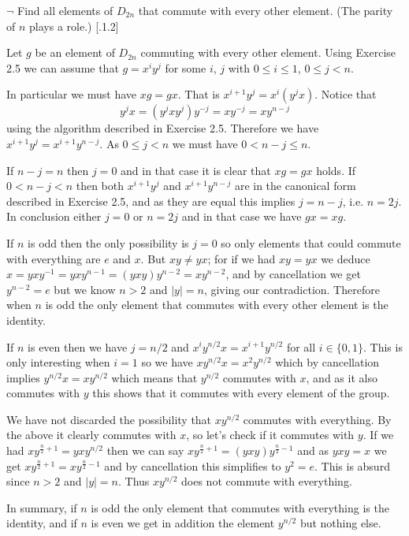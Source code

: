 \begin{exercise}
	$\neg$ Find all elements of $D_{2n}$ that commute with every other element. (The parity of $n$ plays a role.) [.1.2]
\end{exercise}
\begin{solution}
	Let $g$ be an element of $D_{2n}$ commuting with every other element. Using Exercise 2.5 we can assume that $g = x^iy^j$ for some $i$, $j$ with $0 \leq i \leq 1$, $0\leq j < n$. 
	
	In particular we must have $xg = gx$. That is $x^{i+1}y^j = x^i(y^jx)$. Notice that 
	\[
		y^jx = (y^jxy^j)y^{-j} = xy^{-j} = xy^{n-j}
	\]
	using the algorithm described in Exercise 2.5. Therefore we have $x^{i+1}y^j = x^{i+1}y^{n-j}$. As $0\leq j < n$ we must have $0<n-j\leq n$.
	
	If $n-j = n$ then $j = 0$ and in that case it is clear that $xg=gx$ holds. If $0<n-j <n$ then both $x^{i+1}y^j$ and $x^{i+1}y^{n-j}$ are in the canonical form described in Exercise 2.5, and as they are equal this implies $j = n-j$, i.e. $n = 2j$. In conclusion either $j = 0$ or $n = 2j$ and in that case we have $gx = xg$.
	
	If $n$ is odd then the only possibility is $j=0$ so only elements that could commute with everything are $e$ and $x$. But $xy\neq yx$; for if we had $xy = yx$ we deduce $x = yxy^{-1} = yxy^{n-1} = (yxy)y^{n-2} = xy^{n-2}$, and by cancellation we get $y^{n-2} = e$ but we know $n>2$ and $|y| = n$, giving our contradiction. Therefore when $n$ is odd the only element that commutes with every other element is the identity.
	
	If $n$ is even then we have $j = n/2$ and $x^iy^{n/2} x = x^{i+1}y^{n/2}$ for all $i\in\{0,1\}$. This is only interesting when $i = 1$ so we have $xy^{n/2}x = x^2y^{n/2}$ which by cancellation implies $y^{n/2}x = xy^{n/2}$ which means that $y^{n/2}$ commutes with $x$, and as it also commutes with $y$ this shows that it commutes with every element of the group.
	
	We have not discarded the possibility that $xy^{n/2}$ commutes with everything. By the above it clearly commutes with $x$, so let's check if it commutes with $y$. If we had $xy^{\frac{n}{2} + 1} = yxy^{n/2}$ then we can say  $xy^{\frac{n}{2} + 1} = (yxy)y^{\frac{n}{2} - 1}$ and as $yxy= x$ we get  $xy^{\frac{n}{2} + 1} = xy^{\frac{n}{2} - 1}$ and by cancellation this simplifies to $y^2 = e$. This is absurd since $n>2$ and $|y| = n$. Thus $xy^{n/2}$ does not commute with everything.
	
	In summary, if $n$ is odd the only element that commutes with everything is the identity, and if $n$ is even we get in addition the element $y^{n/2}$ but	 nothing else.
\end{solution}

